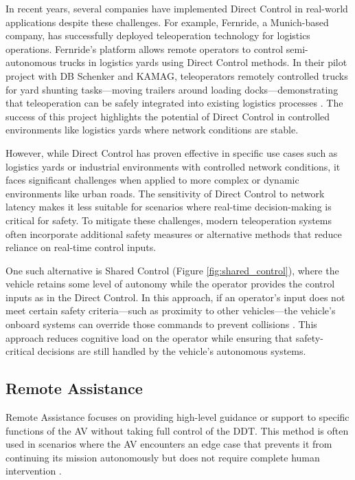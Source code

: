 In recent years, several companies have implemented Direct Control
in real-world applications despite these challenges. For example,
Fernride, a Munich-based company, has successfully deployed
teleoperation technology for logistics operations. Fernride's
platform allows remote operators to control semi-autonomous
trucks in logistics yards using Direct Control methods.
In their pilot project with DB Schenker and KAMAG,
teleoperators remotely controlled trucks for yard shunting
tasks—moving trailers around loading docks—demonstrating that
teleoperation can be safely integrated into existing logistics
processes \cite{fernride2023}. The success of this project
highlights the potential of Direct Control in controlled
environments like logistics yards where network conditions are stable.

However, while Direct Control has proven effective in specific use cases
such as logistics yards or industrial environments with
controlled network conditions, it faces significant challenges when
applied to more complex or dynamic environments like urban roads.
The sensitivity of Direct Control to network latency makes it less
suitable for scenarios where real-time decision-making is critical for
safety. To mitigate these challenges, modern teleoperation systems
often incorporate additional safety measures or alternative methods
that reduce reliance on real-time control inputs.

One such alternative is Shared Control (Figure \ref{fig:shared_control}), where the vehicle retains
some level of autonomy while the operator provides the control inputs as in the Direct Control.
In this approach, if an operator's input does not meet
certain safety criteria—such as proximity to other vehicles—the
vehicle's onboard systems can override those commands to prevent
collisions \cite{kay2024sharedcontrol}. This approach reduces
cognitive load on the operator while ensuring that safety-critical
decisions are still handled by the vehicle's autonomous systems.

\subsection{Remote Assistance}
Remote Assistance focuses on providing high-level guidance or support
to specific functions of the AV without taking full control of the DDT.
This method is often used in scenarios where the AV encounters an
edge case that prevents it from continuing its mission autonomously
but does not require complete human intervention \cite{Brecht}.

